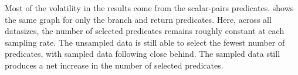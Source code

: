 Most of the volatility in the results come from the scalar-pairs
predicates.   shows the same graph for
only the branch and return predicates.  Here, across all datasizes,
the number of selected predicates remains roughly constant at each
sampling rate.  The unsampled data is still able to select the fewest
number of predicates, with  sampled data following
close behind.  The  sampled data still produces a
net increase in the number of selected predicates.

